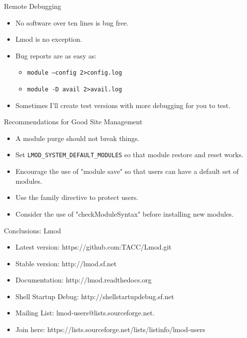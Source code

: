 \documentclass[dvipsnames,aspectratio=169]{beamer}
\begin{document}
\begin{frame}{Remote Debugging}
  \begin{itemize}
    \item No software over ten lines is bug free.
    \item Lmod is no exception.
    \item Bug reports are as easy as:
      \begin{itemize}
        \item \texttt{module --config  2\textgreater  config.log}
        \item \texttt{module -D avail  2\textgreater  avail.log}
      \end{itemize}
    \item Sometimes I'll create test versions with more debugging for
      you to test.
  \end{itemize}
\end{frame}

\begin{frame}{Recommendations for Good Site Management}
  \begin{itemize}
    \item A module purge should not break things.
    \item Set \texttt{LMOD\_SYSTEM\_DEFAULT\_MODULES} so that module
      restore and reset works.
    \item Encourage the use of "module save" so that users can have a
      default set of modules.
    \item Use the family directive to protect users.
    \item Consider the use of "checkModuleSyntax" before installing new modules.
  \end{itemize}
\end{frame}

\begin{frame}{Conclusions: Lmod}
  \begin{itemize}
    \item Latest version: https://github.com:TACC/Lmod.git
    \item Stable version: http://lmod.sf.net
    \item Documentation:  http://lmod.readthedocs.org
    \item Shell Startup Debug: http://shellstartupdebug.sf.net
    \item Mailing List:   lmod-users@lists.sourceforge.net.
    \item Join here: https://lists.sourceforge.net/lists/listinfo/lmod-users
  \end{itemize}
\end{frame}


%
\end{document}
